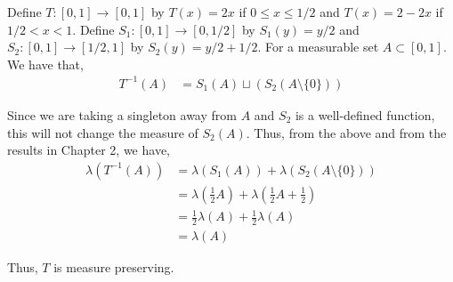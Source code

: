 \documentclass[12pt]{article}
\newenvironment{problem}[2][Problem]{\begin{trivlist}
\item[\hskip \labelsep {\bfseries #1}\hskip \labelsep {\bfseries #2.}]}{\end{trivlist}}
\begin{document}
\begin{problem}{1}
\end{problem}

Define $T: [0, 1] \to [0,1]$ by $T(x) = 2x$ if $0 \leq x \leq 1/2$ and $T(x) = 2 - 2x$ if $1/2 < x < 1$. Define $S_1: [0, 1] \to [0, 1/2]$ by $S_1(y) = y/2$ and $S_2: [0, 1] \to [1/2, 1]$ by $S_2(y) = y/2 + 1/2$. For a measurable set $A \subset [0, 1]$. We have that,
\begin{align*}
T^{-1}(A) &= S_1(A) \sqcup (S_2(A \setminus \{0\}))
\end{align*}

Since we are taking a singleton away from $A$ and $S_2$ is a well-defined function, this will not change the measure of $S_2(A)$. Thus, from the above and from the results in Chapter 2, we have,
\begin{align*}
\lambda(T^{-1}(A)) &= \lambda(S_1(A)) + \lambda(S_2(A \setminus \{0\}))\\
&= \lambda(\frac{1}{2}A) + \lambda(\frac{1}{2}A + \frac{1}{2})\\
&= \frac{1}{2}\lambda(A) + \frac{1}{2}\lambda(A)\\
&= \lambda(A)
\end{align*}

Thus, $T$ is measure preserving.
\end{document}
